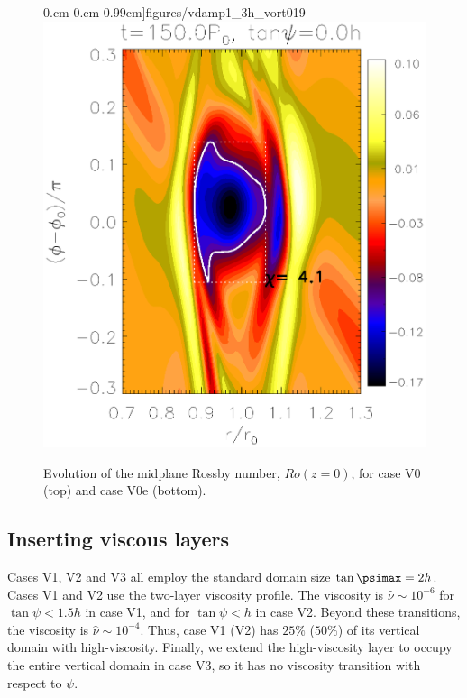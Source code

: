 \begin{figure}
     0.cm 0.cm
     0.99cm]{figures/vdamp1_3h_vort019}\includegraphics[scale=.27,clip=true,clip=true,trim=2.3cm
     0.cm 0.cm
     0.99cm]{figures/vdamp1_3h_vort024}
   \caption{Evolution of the midplane Rossby number, $Ro(z=0)$, for
     case V0 (top) and case V0e (bottom).
   \label{vdamp0_vdamp1_3h_vort}}
 \end{figure}

\subsection{Inserting viscous layers}

Cases V1, V2 and V3 all employ the standard domain size
$\tan{\psimax}=2h$. Cases V1 and V2 use the two-layer viscosity
profile. The viscosity is $\hat{\nu}\sim 10^{-6}$ for
$\tan\psi < 1.5h$ in case V1, and for $\tan\psi < h$ in case
V2. Beyond these transitions, the viscosity is
$\hat{\nu}\sim10^{-4}$. Thus, case V1 (V2) has $25\%$ ($50\%$) of its
vertical domain with high-viscosity. Finally, we extend the
high-viscosity layer to occupy the entire vertical domain in case
V3, so it has no viscosity transition with respect to $\psi$. 

